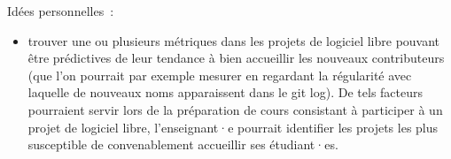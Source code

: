 Idées personnelles :

\begin{itemize}
    \item trouver une ou plusieurs métriques dans les projets de logiciel libre pouvant être prédictives de
        leur tendance à bien accueillir les nouveaux contributeurs (que l'on pourrait par exemple mesurer en
        regardant la régularité avec laquelle de nouveaux noms apparaissent dans le git log). De tels facteurs
        pourraient servir lors de la préparation de cours consistant à participer à un projet de logiciel
        libre, l'enseignant·e pourrait identifier les projets les plus susceptible de convenablement
        accueillir ses étudiant·es.
\end{itemize}
